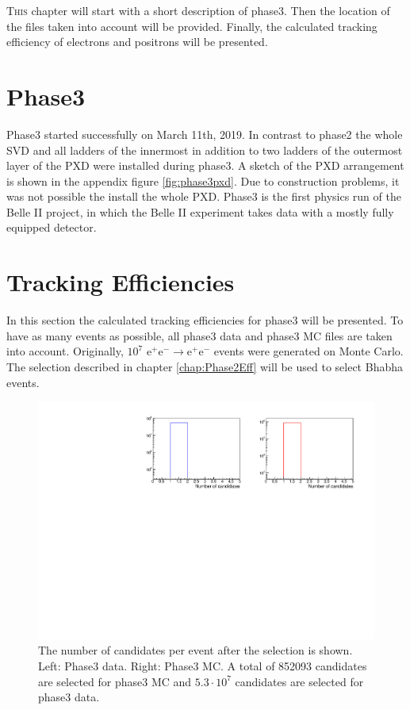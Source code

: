 \documentclass[a4paper,11pt,twosided,final,german,openbib,pdftex,listof=totoc,bibliography=totoc]{scrbook}
\begin{document}
\lettrine{T}{his} chapter will start with a short description of phase3. Then the location of the files taken into account will be provided. Finally, the calculated tracking efficiency of electrons and positrons will be presented.

\section{Phase3}
\label{sec:P3}

Phase3 started successfully on March 11th, 2019. In contrast to phase2 the whole SVD and all ladders of the innermost in addition to two ladders of the outermost layer of the PXD were installed during phase3. A sketch of the PXD arrangement is shown in the appendix figure \ref{fig:phase3pxd}. Due to construction problems, it was not possible the install the whole PXD. Phase3 is the first physics run of the Belle II project, in which the Belle II experiment takes data with a mostly fully equipped detector.\cite{phase3}





\section{Tracking Efficiencies}

In this section the calculated tracking efficiencies for phase3 will be presented. To have as many events as possible, all phase3 data and phase3 MC files are taken into account. Originally, $10^7$ $\textrm{e}^+\textrm{e}^- \rightarrow  \textrm{e}^+\textrm{e}^-  $ events were generated on Monte Carlo.
The selection described in chapter \ref{chap:Phase2Eff} will be used to select Bhabha events.

\begin{figure}[h!]
	\includegraphics[width=\textwidth]{Plots/master3/CCandP3.pdf}
	\caption[Total Number Of Events After The Selection Phase3]{The number of candidates per event after the selection is shown. Left: Phase3 data. Right: Phase3 MC. A total of 852093 candidates are selected for phase3 MC and $5.3\cdot10^7$ candidates are selected for phase3 data.}
	\label{fig:nCandAS3}
\end{figure}
\end{document}
